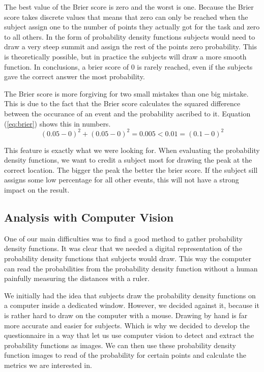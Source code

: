 \documentclass[../main/main.tex]{subfiles}
\begin{document}
	The best value of the Brier score is zero and the worst is one. Because the Brier score takes discrete values that means that zero can only be reached when the subject assign one to the number of points they actually got for the task and zero to all others. In the form of probability density functions subjects would need to draw a very steep summit and assign the rest of the points zero probability. This is theoretically possible, but in practice the subjects will draw a more smooth function. In conclusions, a brier score of 0 is rarely reached, even if the subjects gave the correct answer the most probability.
	
	The Brier score is more forgiving for two small mistakes than one big mistake. This is due to the fact that the Brier score calculates the squared difference between the occurance of an event and the probability ascribed to it. Equation (\ref{eq:brier}) shows this in numbers.
	\begin{equation}
	\label{eq:brier}
	(0.05 - 0)^2 + (0.05 - 0)^2 = 0.005 < 0.01 = (0.1 - 0)^2
	\end{equation}
	
	This feature is exactly what we were looking for. When evaluating the probability density functions, we want to credit a subject most for drawing the peak at the correct location. The bigger the peak the better the brier score. If the subject sill assigns some low percentage for all other events, this will not have a strong impact on the result.
	
	\subsection{Analysis with Computer Vision}
	\label{sec:computer_vision}
	
	One of our main difficulties was to find a good method to gather probability density functions. It was clear that we needed a digital representation of the probability density functions that subjects would draw. This way the computer can read the probabilities from the probability density function without a human painfully measuring the distances with a ruler.
	
	We initially had the idea that subjects draw the probability density functions on a computer inside a dedicated window. However, we decided against it, because it is rather hard to draw on the computer with a mouse. Drawing by hand is far more accurate and easier for subjects. Which is why we decided to develop the questionnaire in a way that let us use computer vision to detect and extract the probability functions as images. We can then use these probability density function images to read of the probability for certain points and calculate the metrics we are interested in.
	
\end{document}
